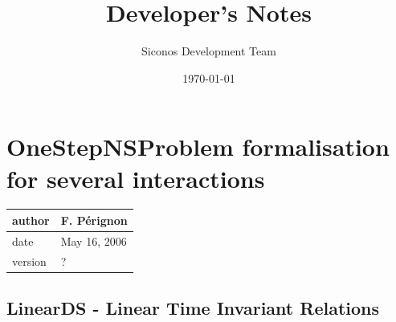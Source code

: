 \documentclass[10pt]{report}
\begin{document}
\thispagestyle{empty}
\title{Developer's Notes}
\author{Siconos Development Team}

\date{\today}
\maketitle

\tableofcontents
\clearpage
\pagestyle{fancy}

\chapter{OneStepNSProblem formalisation for several interactions}

\begin{table}[!ht]
  \begin{tabular}{|l|l|}
    \hline
    author  & F. P\'erignon \\
    \hline
    date    & May 16, 2006 \\
    \hline
    version & ? \\
    \hline
  \end{tabular}
\end{table}



\section{LinearDS - Linear Time Invariant Relations}
\end{document}
